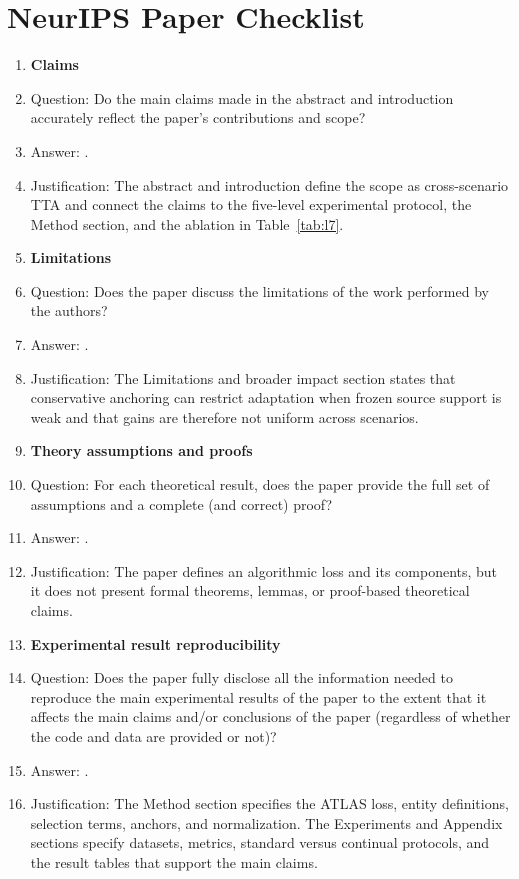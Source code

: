 \section*{NeurIPS Paper Checklist}

\begin{enumerate}

\item {\bf Claims}
    \item[] Question: Do the main claims made in the abstract and introduction accurately reflect the paper's contributions and scope?
    \item[] Answer: \answerYes{}.
    \item[] Justification: The abstract and introduction define the scope as cross-scenario TTA and connect the claims to the five-level experimental protocol, the Method section, and the ablation in Table~\ref{tab:l7}.

\item {\bf Limitations}
    \item[] Question: Does the paper discuss the limitations of the work performed by the authors?
    \item[] Answer: \answerYes{}.
    \item[] Justification: The Limitations and broader impact section states that conservative anchoring can restrict adaptation when frozen source support is weak and that gains are therefore not uniform across scenarios.

\item {\bf Theory assumptions and proofs}
    \item[] Question: For each theoretical result, does the paper provide the full set of assumptions and a complete (and correct) proof?
    \item[] Answer: \answerNA{}.
    \item[] Justification: The paper defines an algorithmic loss and its components, but it does not present formal theorems, lemmas, or proof-based theoretical claims.

\item {\bf Experimental result reproducibility}
    \item[] Question: Does the paper fully disclose all the information needed to reproduce the main experimental results of the paper to the extent that it affects the main claims and/or conclusions of the paper (regardless of whether the code and data are provided or not)?
    \item[] Answer: \answerYes{}.
    \item[] Justification: The Method section specifies the ATLAS loss, entity definitions, selection terms, anchors, and normalization. The Experiments and Appendix sections specify datasets, metrics, standard versus continual protocols, and the result tables that support the main claims.


\end{enumerate}

